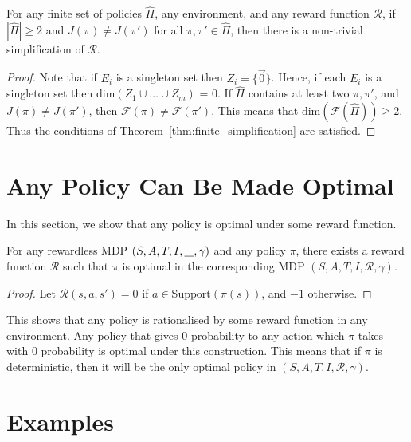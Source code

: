 \begin{corollary}
For any finite set of policies $\hat{\Pi}$, any environment, and any reward function $\mathcal{R}$, if $|\hat{\Pi}| \geq 2$ and $J(\pi) \neq J(\pi')$ for all $\pi,\pi' \in \hat{\Pi}$, then there is a non-trivial simplification of $\mathcal{R}$.
\end{corollary}
\begin{proof}
Note that if $E_i$ is a singleton set then $Z_i = \{\vec{0}\}$. Hence, if each $E_i$ is a singleton set then $\mathrm{dim}(Z_1 \cup \dots \cup Z_m)$ = 0. If $\hat{\Pi}$ contains at least two $\pi,\pi'$, and $J(\pi) \neq J(\pi')$, then  $\mathcal{F}(\pi) \neq \mathcal{F}(\pi')$. This means that $\mathrm{dim}(\mathcal{F}(\hat{\Pi})) \geq 2$. Thus the conditions of Theorem~\ref{thm:finite_simplification} are satisfied.
\end{proof}





\section{Any Policy Can Be Made Optimal}\label{sec:any_policy_optimal}

In this section, we show that any policy is optimal under some reward function.

\begin{proposition}
For any rewardless MDP $(S,A,T,I,\underline{\hspace*{0.3cm}},\gamma)$ and any policy $\pi$, there exists a reward function $\mathcal{R}$ such that $\pi$ is optimal in the corresponding MDP $(S,A,T,I,\mathcal{R},\gamma)$.
\end{proposition}
\begin{proof}
Let $\mathcal{R}(s,a,s') = 0$ if $a \in \mathrm{Support}(\pi(s))$, and $-1$ otherwise.
\end{proof}

This shows that any policy is rationalised by some reward function in any environment.
Any policy that gives $0$ probability to any action which $\pi$ takes with $0$ probability is optimal under this construction. This means that if $\pi$ is deterministic, then it will be the only optimal policy in $(S,A,T,I,\mathcal{R},\gamma)$.

\section{Examples}
\label{sec:examples}

